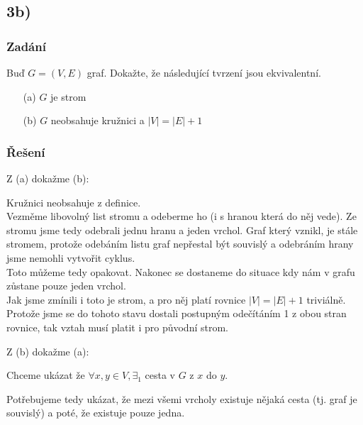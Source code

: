 \documentclass[../main.tex]{subfiles}
\begin{document}
\subsection*{3b)}
\subsubsection*{Zadání}
Buď $G=(V,E)$ graf. Dokažte, že následující tvrzení jsou ekvivalentní.
\begin{enumerate}
    \item[(a)] $G$ je strom
    \item[(b)] $G$ neobsahuje kružnici a $|V| = |E| + 1$
\end{enumerate}

\subsubsection*{Řešení}

Z (a) dokažme (b):

Kružnici neobsahuje z definice.\\
Vezměme libovolný list stromu a odeberme ho (i s hranou která do něj vede).
Ze stromu jsme tedy odebrali jednu hranu a jeden vrchol. Graf který vznikl,
je stále stromem, protože odebáním listu graf nepřestal být souvislý a odebráním hrany jsme nemohli vytvořit cyklus.\\
Toto můžeme tedy opakovat. Nakonec se dostaneme do situace kdy nám v grafu zůstane pouze jeden vrchol.\\
Jak jsme zmínili i toto je strom, a pro něj platí rovnice $|V|=|E|+1$ triviálně.
Protože jsme se do tohoto stavu dostali postupným odečítáním 1 z obou stran rovnice, tak vztah musí platit i pro původní strom.


Z (b) dokažme (a):

Chceme ukázat že $\forall x,y \in V, \exists_1$ cesta v $G$ z $x$ do $y$. 

Potřebujeme tedy ukázat, že mezi všemi vrcholy existuje nějaká cesta (tj. graf je souvislý) a poté, že existuje pouze jedna.
\end{document}
